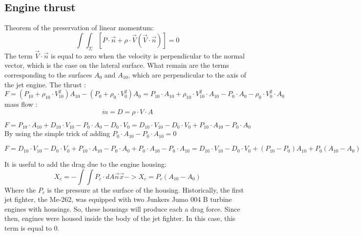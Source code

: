 \documentclass[12pt,a4paper]{article}
\begin{document}
	\subsection{Engine thrust}
	Theorem of the preservation of linear momentum:
	\begin{equation}
		\int \int_{\Sigma} [P \cdot \vec{n}+ \rho \cdot \vec{V} (\vec{V} \cdot \vec{n})] = 0
	\end{equation}
	The term $\vec{V} \cdot \vec{n}$ is equal to zero when the velocity is perpendicular to the normal vector, which is the case on the lateral surface.
	What remain are the terms corresponding to the surfaces $A_0$ and $A_{10}$, which are perpendicular to the axis of the jet engine. 
	The thrust : 
	\begin{dmath}
		F = (P_{10} + \rho_{10} \cdot V_{10}^2) A_{10} - (P_{0} + \rho_{0} \cdot V_{0}^2) A_0 = P_{10} \cdot A_{10} + \rho_{10} \cdot V_{10}^2 \cdot A_{10} - P_{0} \cdot A_0 - \rho_{0} \cdot V_{0}^2 \cdot A_0
	\end{dmath}
	mass flow : 
	\begin{equation}
		\dot{m} = D = \rho \cdot V \cdot A
	\end{equation}
	
	\begin{dmath}
		F = P_{10} \cdot A_{10} + D_{10} \cdot V_{10} - P_{0} \cdot A_0 - D_{0} \cdot V_{0} = D_{10} \cdot V_{10} - D_{0} \cdot V_{0} + P_{10} \cdot A_{10} - P_{0} \cdot A_0
	\end{dmath}
	By using the simple trick of adding $P_0 \cdot A_{10} - P_0 \cdot A_{10}=0$
	
	\begin{dmath}
		F = D_{10} \cdot V_{10} - D_{0} \cdot V_{0} + P_{10} \cdot A_{10} - P_{0} \cdot A_0 + P_0 \cdot A_{10} - P_0 \cdot A_{10} = D_{10} \cdot V_{10} - D_{0} \cdot V_{0} + (P_{10} - P_0) A_{10} + P_0 (A_{10} -A_0)
	\end{dmath}
	
	It is useful to add the drag due to the engine housing: 
	\begin{equation}
		X_c = - \int \int P_c \cdot dA \vec{n} \vec{x} -> X_c = P_c (A_{10} - A_0)
	\end{equation}
	Where the $P_c$ is the pressure at the surface of the housing. 
	Historically, the first jet fighter, the Me-262, was equipped with two Junkers Jumo 004 B turbine engines with housings. So, these housings will produce each a drag force. 
	Since then, engines were housed inside the body of the jet fighter. In this case, this term is equal to 0. 
		
\end{document}

